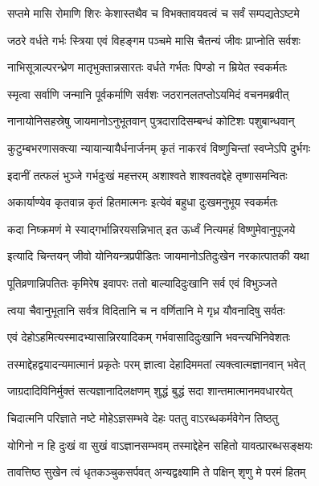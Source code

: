 \twolineshloka
{सप्तमे मासि रोमाणि शिरः केशास्तथैव च}
{विभक्तावयवत्वं च सर्वं सम्पद्यतेऽष्टमे} %

\twolineshloka
{जठरे वर्धते गर्भः स्त्रिया एवं विहङ्गम}
{पञ्चमे मासि चैतन्यं जीवः प्राप्नोति सर्वशः} %

\twolineshloka
{नाभिसूत्राल्परन्ध्रेण मातृभुक्तान्नसारतः}
{वर्धते गर्भतः पिण्डो न म्रियेत स्वकर्मतः} %

\twolineshloka
{स्मृत्वा सर्वाणि जन्मानि पूर्वकर्माणि सर्वशः}
{जठरानलतप्तोऽयमिदं वचनमब्रवीत्} %

\twolineshloka
{नानायोनिसहस्रेषु जायमानोऽनुभूतवान्}
{पुत्रदारादिसम्बन्धं कोटिशः पशुबान्धवान्} %

\twolineshloka
{कुटुम्बभरणासक्त्या न्यायान्यायैर्धनार्जनम्}
{कृतं नाकरवं विष्णुचिन्तां स्वप्नेऽपि दुर्भगः} %

\twolineshloka
{इदानीं तत्फलं भुञ्जे गर्भदुःखं महत्तरम्}
{अशाश्वते शाश्वतवद्देहे तृष्णासमन्वितः} %

\twolineshloka
{अकार्याण्येव कृतवान्न कृतं हितमात्मनः}
{इत्येवं बहुधा दुःखमनुभूय स्वकर्मतः} %

\twolineshloka
{कदा निष्क्रमणं मे स्याद्गर्भान्निरयसन्निभात्}
{इत ऊर्ध्वं नित्यमहं विष्णुमेवानुपूजये} %

\twolineshloka
{इत्यादि चिन्तयन् जीवो योनियन्त्रप्रपीडितः}
{जायमानोऽतिदुःखेन नरकात्पातकी यथा} %

\twolineshloka
{पूतिव्रणान्निपतितः कृमिरेष इवापरः}
{ततो बाल्यादिदुःखानि सर्व एवं विभुञ्जते} %

\twolineshloka
{त्वया चैवानुभूतानि सर्वत्र विदितानि च}
{न वर्णितानि मे गृध्र यौवनादिषु सर्वतः} %

\twolineshloka
{एवं देहोऽहमित्यस्मादभ्यासान्निरयादिकम्}
{गर्भवासादिदुःखानि भवन्त्यभिनिवेशतः} %

\twolineshloka
{तस्माद्देहद्वयादन्यमात्मानं प्रकृतेः परम्}
{ज्ञात्वा देहादिममतां त्यक्त्वात्मज्ञानवान् भवेत्} %

\twolineshloka
{जाग्रदादिविनिर्मुक्तं सत्यज्ञानादिलक्षणम्}
{शुद्धं बुद्धं सदा शान्तमात्मानमवधारयेत्} %

\twolineshloka
{चिदात्मनि परिज्ञाते नष्टे मोहेऽज्ञसम्भवे}
{देहः पततु वाऽरब्धकर्मवेगेन तिष्ठतु} %

\twolineshloka
{योगिनो न हि दुःखं वा सुखं वाऽज्ञानसम्भवम्}
{तस्माद्देहेन सहितो यावत्प्रारब्धसङ्क्षयः} %

\twolineshloka
{तावत्तिष्ठ सुखेन त्वं धृतकञ्चुकसर्पवत्}
{अन्यद्वक्ष्यामि ते पक्षिन् शृणु मे परमं हितम्} %

